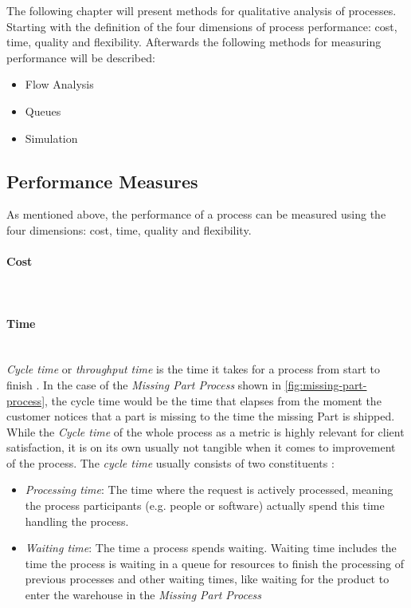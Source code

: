 The following chapter will present methods for qualitative analysis of processes. Starting with the definition of the four dimensions of process performance: cost, time, quality and flexibility. Afterwards the following methods for measuring performance will be described: 

\begin{itemize}
	\item Flow Analysis
	\item Queues
	\item Simulation
\end{itemize}
\subsection{Performance Measures}
As mentioned above, the performance of a process can be measured using the four dimensions:  cost, time, quality and flexibility. 
\paragraph{Cost}~\\

\paragraph{Time}~\\
\textit{Cycle time} or \textit{throughput time} is the time it takes for a process from start to finish \cite{Six-sigma-terms}. In the case of the \textit{Missing Part Process} shown in \ref{fig:missing-part-process}, the cycle time would be the time that elapses from the moment the customer notices that a part is missing to the time the missing Part is shipped. While the \textit{Cycle time} of the whole process as a metric is highly relevant for client satisfaction, it is on its own usually not tangible when it comes to improvement of the process. The \textit{cycle time} usually consists of two constituents \cite{fundamentals}:
\begin{itemize}
	\item \textit{Processing time}: The time where the request is actively processed, meaning the process participants (e.g. people or software) actually spend this time handling the process. 
	\item \textit{Waiting time}: The time a process spends waiting. Waiting time includes the time the process is waiting in a queue for resources to finish the processing of previous processes and other waiting times, like waiting for the product to enter the warehouse in the \textit{Missing Part Process}
\end{itemize}
